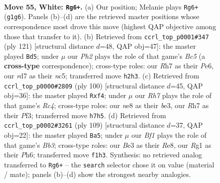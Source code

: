 \documentclass[11pt]{article}
\begin{document}
\clearpage

\begin{figure}[p]\centering
\begin{subfigure}{0.46\textwidth}\centering
\resizebox{\linewidth}{!}{%
\newchessgame
\chessboard[
  setfen={4n3/p1pr3R/4k3/5p2/r4P2/4B3/2K4P/5BR1 w - - 14 55},
  showmover=false,
  pgfstyle=straightmove, color=movearrow, markmove={g1-g6}
]}
\caption{}
\end{subfigure}\hfill
\begin{subfigure}{0.46\textwidth}\centering
\resizebox{\linewidth}{!}{%
\newchessgame
\chessboard[
  setfen={6k1/8/4p2P/2N1P3/2bp4/Pp4K1/1Pr4R/8 b - - 2 61},
  showmover=false,
  pgfstyle=straightmove, color=movearrow, markmove={c4-d5}
]}
\caption{}
\end{subfigure}
\\[4pt]
\begin{subfigure}{0.46\textwidth}\centering
\resizebox{\linewidth}{!}{%
\newchessgame
\chessboard[
  setfen={8/p7/5kp1/5p2/PPR2r2/4bP2/2B3K1/8 w - - 1 51},
  showmover=false,
  pgfstyle=straightmove, color=movearrow, markmove={c4-f4}
]}
\caption{}
\end{subfigure}\hfill
\begin{subfigure}{0.46\textwidth}\centering
\resizebox{\linewidth}{!}{%
\newchessgame
\chessboard[
  setfen={4r1k1/p7/1b5p/5r2/3p4/5NPP/3RP1K1/2R5 b - - 2 55},
  showmover=false,
  pgfstyle=straightmove, color=movearrow, markmove={b6-a5}
]}
\caption{}
\end{subfigure}
\caption{\textbf{Move 55, White: \texttt{Rg6+}.} (a) Our position; Melanie plays \texttt{Rg6+} (\texttt{g1g6}). Panels (b)--(d) are the retrieved master positions whose correspondence most drove this move (highest QAP objective among those that transfer to it). (b) Retrieved from \texttt{ccrl\_top\_p0001\#347} (ply 121) [structural distance $d$=48, QAP obj=47]: the master played \texttt{Bd5}; under $\mu$ our \emph{Ph2} plays the role of that game's \emph{Bc5} (a \textbf{cross-type} correspondence); cross-type roles: our \emph{R}h7 as their \emph{P}e6, our \emph{r}d7 as their \emph{n}c5; transferred move \texttt{h2h3}. (c) Retrieved from \texttt{ccrl\_top\_p0000\#2809} (ply 100) [structural distance $d$=45, QAP obj=36]: the master played \texttt{Rxf4}; under $\mu$ our \emph{Rh7} plays the role of that game's \emph{Rc4}; cross-type roles: our \emph{n}e8 as their \emph{b}e3, our \emph{R}h7 as their \emph{P}f3; transferred move \texttt{h7h5}. (d) Retrieved from \texttt{ccrl\_top\_p0002\#3261} (ply 109) [structural distance $d$=37, QAP obj=22]: the master played \texttt{Ba5}; under $\mu$ our \emph{Bf1} plays the role of that game's \emph{Bb3}; cross-type roles: our \emph{B}e3 as their \emph{R}e8, our \emph{R}g1 as their \emph{P}h6; transferred move \texttt{f1h3}. Synthesis: no retrieved analog transferred to \texttt{Rg6+} -- the \texttt{search} selector chose it on value (material / mate); panels (b)--(d) show the strongest nearby analogies.}
\label{fig:thought-m108}
\end{figure}
\end{document}
